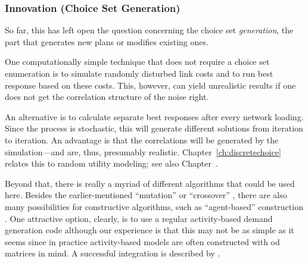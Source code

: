 \subsubsection{Innovation (Choice Set Generation)}

So far, this has left open the question concerning the choice set
\emph{generation}, \ie the part that generates new plans or modifies
existing ones.  

One computationally simple technique that does not require a choice
set enumeration is to simulate randomly disturbed link costs and to
run best response based on these costs. This, however, can yield
unrealistic results if one does not get the correlation structure of
the noise right.

An alternative is to calculate separate best responses after every
network loading.  Since the process is stochastic, this will generate
different solutions from iteration to iteration.  An advantage is that
the correlations will be generated by the simulation---and are, thus,
presumably realistic. Chapter~\ref{ch:discretechoice}
relates this to random utility modeling; see also Chapter~.

Beyond that, there is really a myriad of different algorithms that
could be used here.  Besides the earlier-mentioned ``mutation''
\citep{BalmerRaneyEtAl2005act-times} or ``crossover''
\citep{CharyparNagel2005ga4acts,MeisterBalmerEtc2006planomatIatbr},
there are also many possibilities for constructive algorithms, such as
``agent-based'' construction
\citep{ZhuLevinsonZhang2008AgentBasedRouteChoice2}.  One attractive
option, clearly, is to use a regular activity-based demand generation
code \citep[e.g.,][]{BowmanEtc1999PortlandActs,MillerRoordaTASHA}
although our experience is that this may not be as simple as it seems
\citep{RieserNagelEtc2007early-berlin-trr} since in practice
activity-based models are often constructed with \gls{od} matrices in mind.  
A successful integration is described by 
\cite{ZiemkeNagelBhatIntegratingCemdapMatsimTransferability}.



